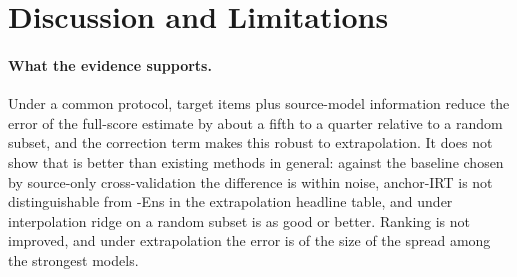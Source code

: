 \section{Discussion and Limitations}
\label{sec:disc}
\paragraph{What the evidence supports.}
Under a common protocol, target items plus source-model information reduce the error of the full-score estimate by about a fifth to a quarter relative to a random subset, and the correction term makes this robust to extrapolation. It does not show that \mass{} is better than existing methods in general: against the baseline chosen by source-only cross-validation the difference is within noise, anchor-IRT is not distinguishable from \mass{}-Ens in the extrapolation headline table, and under interpolation ridge on a random subset is as good or better. Ranking is not improved, and under extrapolation the error is of the size of the spread among the strongest models.

